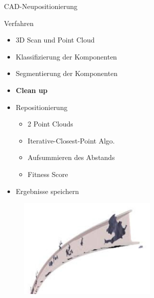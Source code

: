 \begin{frame}{CAD-Neupositionierung}
    \begin{minipage}[]{0.49\textwidth}
    \begin{block}{Verfahren}
        \begin{itemize}
            \item 3D Scan und Point Cloud
            \item Klassifizierung der Komponenten
            \item Segmentierung der Komponenten
            \item \textbf{Clean up}
            \item Repositionierung
            \begin{itemize}
                \item 2 Point Clouds
                \item Iterative-Closest-Point Algo.
                \item Aufsummieren des Abstands
                \item Fitness Score
            \end{itemize}
            \item Ergebnisse speichern
        \end{itemize}
    \end{block}
    \end{minipage}
    \begin{minipage}[]{0.49\textwidth}
      \begin{figure}
          \includegraphics[width=190pt]{img_niklas/clean_up_before.jpg}
          \label{fig:my_label}
      \end{figure}
    \end{minipage}
\end{frame}

